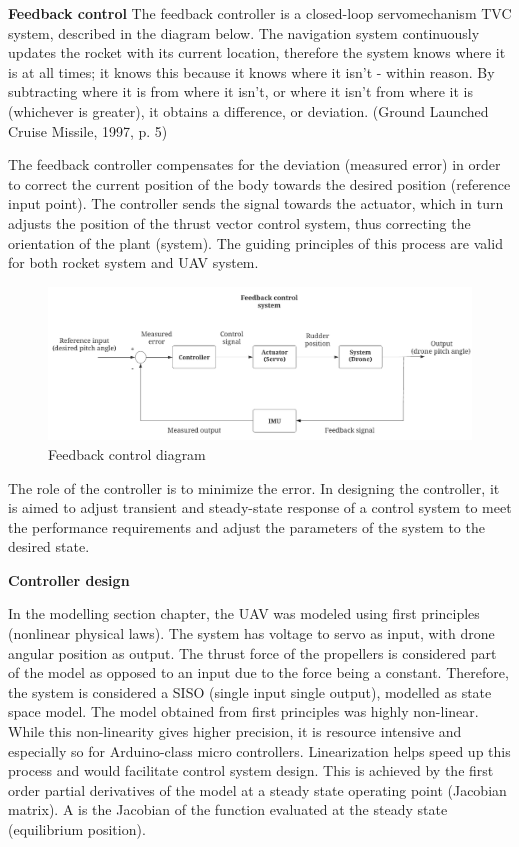 \textbf{Feedback control}
The feedback controller is a closed-loop servomechanism TVC system, described in the diagram below. 
The navigation system continuously updates the rocket with its current location, therefore the system knows where it is at all times; it knows this because it knows where it isn't - within reason. By subtracting where it is from where it isn't, or where it isn't from where it is (whichever is greater), it obtains a difference, or deviation. (Ground Launched Cruise Missile, 1997, p. 5) \cite{victors_1997}

The feedback controller compensates for the deviation (measured error) in order to correct the current position of the body towards the desired position (reference input point). The controller sends the signal towards the actuator, which in turn adjusts the position of the thrust vector control system, thus correcting the orientation of the plant (system). The guiding principles of this process are valid for both rocket system and UAV system. 


\begin{figure}[h!]
  \includegraphics[scale=0.5]{graphics/Feedback.png}
  \caption{Feedback control diagram}
  \label{Feedback control diagram}
\end{figure}


The role of the controller is to minimize the error. In designing the controller, it is aimed to adjust transient and steady-state response of a control system to meet the performance requirements and adjust the parameters of the system to the desired state. \cite{yanushevsky2018modern} 

\textbf{Controller design}

In the modelling section chapter, the UAV was modeled using first principles (nonlinear physical laws).
The system has voltage to servo as input, with drone angular position as output. The thrust force of the propellers is considered part of the model as opposed to an input due to the force being a constant. 
Therefore, the system is considered a SISO (single input single output), modelled as state space model.
The model obtained from first principles was highly non-linear.
While this non-linearity gives higher precision, it is resource intensive and especially so for Arduino-class micro controllers. 
Linearization  helps speed up this process and would facilitate control system design. 
This is achieved by the first order partial derivatives of the model at a steady state operating point (Jacobian matrix).
A is the Jacobian of the function evaluated at the steady state (equilibrium position). 

